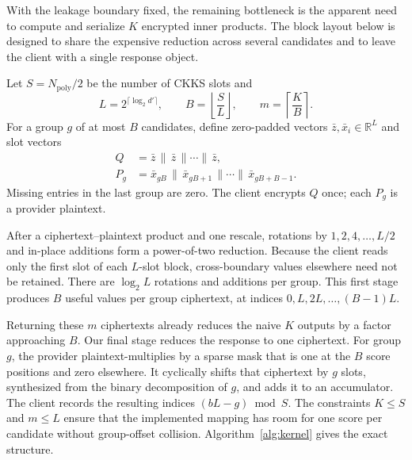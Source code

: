 \documentclass[pdflatex,sn-basic,Numbered]{sn-jnl}
\newcommand{\R}{\mathbb{R}}
\theoremstyle{plain}
\begin{document}
With the leakage boundary fixed, the remaining bottleneck is the apparent need to compute and serialize $K$ encrypted inner products. The block layout below is designed to share the expensive reduction across several candidates and to leave the client with a single response object.

Let $S=N_{\mathrm{poly}}/2$ be the number of CKKS slots and
\begin{equation}
  L=2^{\lceil\log_2 d'\rceil},\qquad B=\left\lfloor\frac{S}{L}\right\rfloor,
  \qquad m=\left\lceil\frac{K}{B}\right\rceil.
  \label{eq:layout-counts}
\end{equation}
For a group $g$ of at most $B$ candidates, define zero-padded vectors
$\bar z,\bar x_i\in\R^L$ and slot vectors
\begin{align}
  Q &= \bar z\,\|\,\bar z\,\|\cdots\|\,\bar z, \\
  P_g &= \bar x_{gB}\,\|\,\bar x_{gB+1}\,\|\cdots\|\,\bar x_{gB+B-1}.
  \label{eq:slot-vectors}
\end{align}
Missing entries in the last group are zero. The client encrypts $Q$ once; each $P_g$ is a provider plaintext.

After a ciphertext--plaintext product and one rescale, rotations by
$1,2,4,\ldots,L/2$ and in-place additions form a power-of-two reduction. Because the client reads only the first slot of each $L$-slot block, cross-boundary values elsewhere need not be retained. There are $\log_2L$ rotations and additions per group. This first stage produces $B$ useful values per group ciphertext, at indices $0,L,2L,\ldots,(B-1)L$.

Returning these $m$ ciphertexts already reduces the naive $K$ outputs by a factor approaching $B$. Our final stage reduces the response to one ciphertext. For group $g$, the provider plaintext-multiplies by a sparse mask that is one at the $B$ score positions and zero elsewhere. It cyclically shifts that ciphertext by $g$ slots, synthesized from the binary decomposition of $g$, and adds it to an accumulator. The client records the resulting indices $(bL-g)\bmod S$. The constraints $K\leq S$ and $m\leq L$ ensure that the implemented mapping has room for one score per candidate without group-offset collision. Algorithm~\ref{alg:kernel} gives the exact structure.
\end{document}
